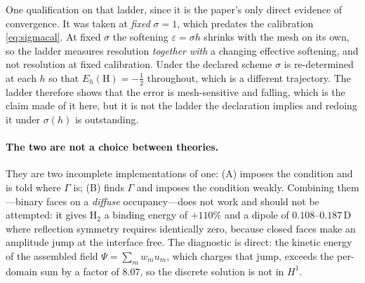 \documentclass[11pt,a4paper]{article}
\begin{document}
One qualification on that ladder, since it is the paper's only direct evidence of convergence. It
was taken at \emph{fixed} $\sigma = 1$, which predates the calibration \eqref{eq:sigmacal}. At fixed
$\sigma$ the softening $\varepsilon = \sigma h$ shrinks with the mesh on its own, so the ladder
measures resolution \emph{together with} a changing effective softening, and not resolution at
fixed calibration. Under the declared scheme $\sigma$ is re-determined at each $h$ so that
$E_h(\mathrm{H}) = -\tfrac12$ throughout, which is a different trajectory. The ladder therefore
shows that the error is mesh-sensitive and falling, which is the claim made of it here, but it is
not the ladder the declaration implies and redoing it under $\sigma(h)$ is outstanding.

\paragraph{The two are not a choice between theories.} They are two incomplete implementations of
one: (A) imposes the condition and is told where $\Gamma$ is; (B) finds $\Gamma$ and imposes the
condition weakly. Combining them---binary faces on a \emph{diffuse} occupancy---does not work and
should not be attempted: it gives H$_2$ a binding energy of $+110\%$ and a dipole of
$0.108$--$0.187\,\mathrm{D}$ where reflection symmetry requires identically zero, because closed
faces make an amplitude jump at the interface free. The diagnostic is direct: the kinetic energy of
the assembled field $\Psi = \sum_m w_m u_m$, which charges that jump, exceeds the per-domain sum by
a factor of $8.07$, so the discrete solution is not in $H^1$.
\end{document}
